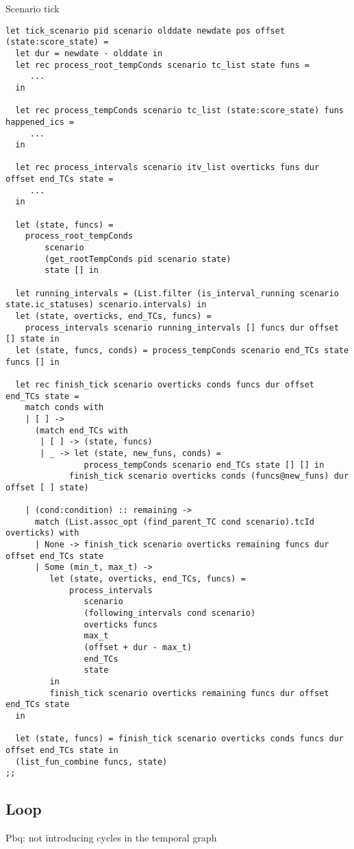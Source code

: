 \documentclass[applsci,article,submit,moreauthors,pdftex,10pt,a4paper]{mdpi}
\begin{document}
Scenario tick 
\begin{lstlisting}
let tick_scenario pid scenario olddate newdate pos offset (state:score_state) =
  let dur = newdate - olddate in
  let rec process_root_tempConds scenario tc_list state funs =
     ...
  in

  let rec process_tempConds scenario tc_list (state:score_state) funs happened_ics =
     ...
  in

  let rec process_intervals scenario itv_list overticks funs dur offset end_TCs state =
     ...
  in
  
  let (state, funcs) =
    process_root_tempConds
        scenario
        (get_rootTempConds pid scenario state)
        state [] in

  let running_intervals = (List.filter (is_interval_running scenario state.ic_statuses) scenario.intervals) in
  let (state, overticks, end_TCs, funcs) =
    process_intervals scenario running_intervals [] funcs dur offset [] state in
  let (state, funcs, conds) = process_tempConds scenario end_TCs state funcs [] in

  let rec finish_tick scenario overticks conds funcs dur offset end_TCs state =
    match conds with
    | [ ] ->
      (match end_TCs with
       | [ ] -> (state, funcs)
       | _ -> let (state, new_funs, conds) =
                process_tempConds scenario end_TCs state [] [] in
             finish_tick scenario overticks conds (funcs@new_funs) dur offset [ ] state)

    | (cond:condition) :: remaining ->
      match (List.assoc_opt (find_parent_TC cond scenario).tcId overticks) with
      | None -> finish_tick scenario overticks remaining funcs dur offset end_TCs state
      | Some (min_t, max_t) ->
         let (state, overticks, end_TCs, funcs) =
             process_intervals
                scenario
                (following_intervals cond scenario)
                overticks funcs
                max_t
                (offset + dur - max_t)
                end_TCs
                state
         in
         finish_tick scenario overticks remaining funcs dur offset end_TCs state
  in
  
  let (state, funcs) = finish_tick scenario overticks conds funcs dur offset end_TCs state in
  (list_fun_combine funcs, state)
;;
\end{lstlisting}

\subsection{Loop}\label{sec.loop}
Pbq: not introducing cycles in the temporal graph
\end{document}
